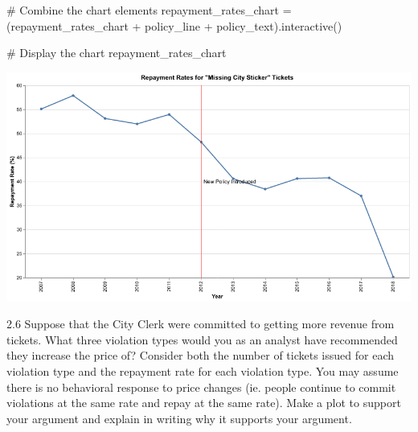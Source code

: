 \documentclass[
  letterpaper,
  DIV=11,
  numbers=noendperiod]{scrartcl}
\newenvironment{Shaded}{\begin{snugshade}}{\end{snugshade}}
\newcommand{\CommentTok}[1]{\textcolor[rgb]{0.37,0.37,0.37}{#1}}
\newcommand{\NormalTok}[1]{\textcolor[rgb]{0.00,0.23,0.31}{#1}}
\newcommand{\OperatorTok}[1]{\textcolor[rgb]{0.37,0.37,0.37}{#1}}
\begin{document}
\begin{Shaded}
\begin{Highlighting}[]
\CommentTok{\# Combine the chart elements}
\NormalTok{repayment\_rates\_chart }\OperatorTok{=}\NormalTok{ (repayment\_rates\_chart }\OperatorTok{+}\NormalTok{ policy\_line }\OperatorTok{+}\NormalTok{ policy\_text).interactive()}

\CommentTok{\# Display the chart}
\NormalTok{repayment\_rates\_chart}
\end{Highlighting}
\end{Shaded}

\includegraphics{ps2_files/figure-pdf/cell-17-output-1.png}

2.6 Suppose that the City Clerk were committed to getting more revenue
from tickets. What three violation types would you as an analyst have
recommended they increase the price of? Consider both the number of
tickets issued for each violation type and the repayment rate for each
violation type. You may assume there is no behavioral response to price
changes (ie. people continue to commit violations at the same rate and
repay at the same rate). Make a plot to support your argument and
explain in writing why it supports your argument.
\end{document}
